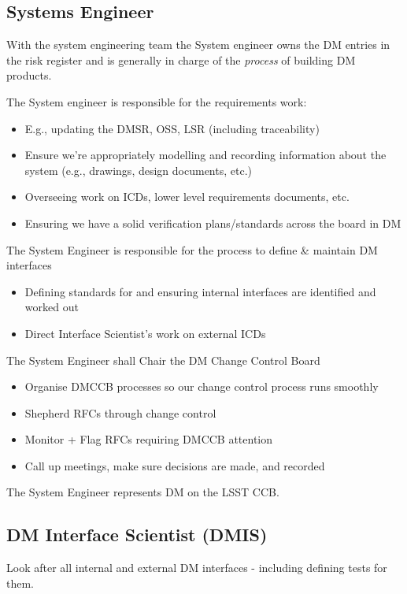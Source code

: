\subsection{Systems Engineer \label{role:sysengineer}}
With the system engineering team  
 the System engineer 
 owns the DM entries in the risk register and is generally in charge of the {\em process} of building DM products. 

The System engineer  
is responsible for the requirements work:
\begin{itemize}
\item E.g., updating the DMSR, OSS, LSR (including traceability)
\item Ensure we’re appropriately modelling and recording information about the system (e.g.,
    drawings, design documents, etc.)
\item Overseeing work on ICDs, lower level requirements documents, etc.
\item Ensuring we have a solid verification plans/standards across the board in DM
\end{itemize}

The System Engineer is responsible for the process to define \& maintain DM interfaces
\begin{itemize}
\item Defining standards for and ensuring internal interfaces are identified and worked out
\item Direct Interface Scientist's work on external ICDs
\end{itemize}

The System Engineer shall Chair the DM Change Control Board 
\begin{itemize}
\item Organise DMCCB  processes so our change control process runs smoothly
\item Shepherd RFCs through change control
\item Monitor + Flag RFCs requiring DMCCB  attention
\item Call up meetings, make sure decisions are made, and recorded
\end{itemize}

The System Engineer represents DM on the LSST CCB.

\subsection{DM Interface Scientist (DMIS) \label{role:dmis}}
Look after all internal and external DM interfaces - including defining tests for them. 

